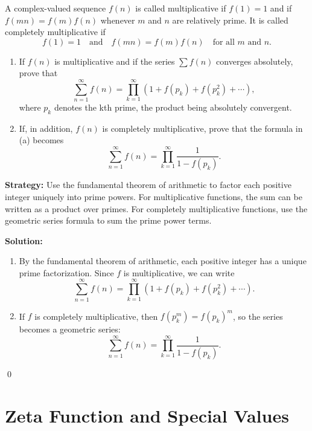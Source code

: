 \begin{problembox}
A complex-valued sequence \(f(n)\) is called multiplicative if \(f(1) = 1\) and if \(f(mn) = f(m)f(n)\) whenever \(m\) and \(n\) are relatively prime. It is called completely multiplicative if
\[f(1) = 1 \quad \text{and} \quad f(mn) = f(m)f(n) \quad \text{for all } m \text{ and } n.\]
\begin{enumerate}[label=\alph*)]
\item If \(f(n)\) is multiplicative and if the series \(\sum f(n)\) converges absolutely, prove that
\[\sum_{n=1}^{\infty} f(n) = \prod_{k=1}^{\infty} (1 + f(p_k) + f(p_k^2) + \cdots),\]
where \(p_k\) denotes the kth prime, the product being absolutely convergent.
\item If, in addition, \(f(n)\) is completely multiplicative, prove that the formula in (a) becomes
\[\sum_{n=1}^{\infty} f(n) = \prod_{k=1}^{\infty} \frac{1}{1 - f(p_k)}.\]
\end{enumerate}
\end{problembox}

\noindent\textbf{Strategy:} Use the fundamental theorem of arithmetic to factor each positive integer uniquely into prime powers. For multiplicative functions, the sum can be written as a product over primes. For completely multiplicative functions, use the geometric series formula to sum the prime power terms.

\bigskip\noindent\textbf{Solution:}
\begin{enumerate}[label=(\alph*)]
\item By the fundamental theorem of arithmetic, each positive integer has a unique prime factorization. Since \(f\) is multiplicative, we can write
\[\sum_{n=1}^{\infty} f(n) = \prod_{k=1}^{\infty} (1 + f(p_k) + f(p_k^2) + \cdots).\]

\item If \(f\) is completely multiplicative, then \(f(p_k^m) = f(p_k)^m\), so the series becomes a geometric series:
\[\sum_{n=1}^{\infty} f(n) = \prod_{k=1}^{\infty} \frac{1}{1 - f(p_k)}.\]
\end{enumerate}\qed

\section{Zeta Function and Special Values}



